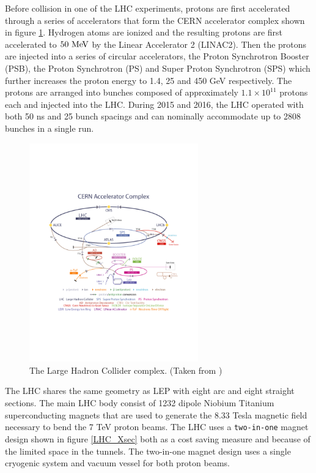 \indent Before collision in one of the LHC experiments, protons are first accelerated through a series of accelerators that form the CERN accelerator complex shown in figure \ref{LHC:fig:LHCComplex}.  Hydrogen atoms are ionized and the resulting protons are first accelerated to $50 \mev$ by the Linear Accelerator 2 (LINAC2).  Then the protons are injected into a series of circular accelerators, the Proton Synchrotron Booster (PSB), the Proton Synchrotron (PS) and Super Proton Synchrotron (SPS) which further increases the proton energy to 1.4, 25 and 450 GeV respectively.  The protons are arranged into bunches composed of approximately $1.1 \times 10^{11}$ protons each and injected into the LHC.  During 2015 and 2016, the LHC operated with both 50 ns and 25 bunch spacings and can nominally accommodate up to 2808 bunches in a single run. \\

\begin{figure}[h!]
\centering
\includegraphics[width=0.65\textwidth, angle=0]{figures/LHC_ATLAS/AccComplex0700829.pdf}
\caption{ The Large Hadron Collider complex. (Taken from \cite{LHC}) \label{LHC:fig:LHCComplex}}
\end{figure}

\indent The LHC shares the same geometry as LEP with eight arc and eight straight sections.  The main LHC body consist of 1232 dipole Niobium Titanium superconducting magnets that are used to generate the 8.33 Tesla magnetic field necessary to bend the 7 TeV proton beams.  The LHC uses a {\tt two-in-one} magnet design shown in figure \ref{LHC_Xsec} both as a cost saving measure and because of the limited space in the tunnels. The two-in-one magnet design uses a single cryogenic system and vacuum vessel for both proton beams.  \\


